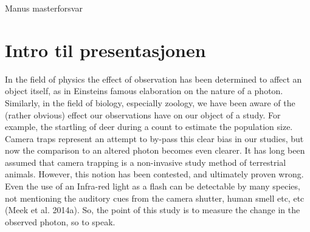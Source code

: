 Manus  masterforsvar


\section{Intro til presentasjonen} 

In the field of physics the effect of observation has been determined to affect an object itself, as in Einsteins famous elaboration on the nature of a photon. Similarly, in the field of biology, especially zoology, we have been aware of the (rather obvious) effect our observations have on our object of a study. For example, the startling of deer during a count to estimate the population size. Camera traps represent an attempt to by-pass this clear bias in our studies, but now the comparison to an altered photon becomes even clearer. It has long been assumed that camera trapping is a non-invasive study method of terrestrial animals. However, this notion has been contested, and ultimately proven wrong. Even the use of an Infra-red light as a flash can be detectable by many species, not mentioning the auditory cues from the camera shutter, human smell etc, etc (Meek et al. 2014a).
So, the point of this study is to measure the change in the observed photon, so to speak.
